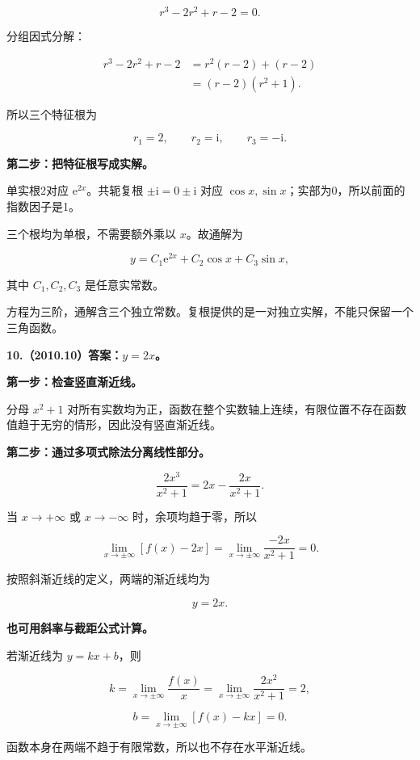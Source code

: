 \documentclass[UTF8,11pt,fontset=windows]{ctexart}
\begin{document}
$$
r^3-2r^2+r-2=0.
$$

分组因式分解：

$$
\begin{aligned}
r^3-2r^2+r-2
&=r^2(r-2)+(r-2)\\
&=(r-2)(r^2+1).
\end{aligned}
$$

所以三个特征根为

$$
r_1=2,\qquad r_2=\mathrm i,\qquad r_3=-\mathrm i.
$$

\textbf{第二步：把特征根写成实解。}

单实根2对应 $\mathrm e^{2x}$。共轭复根 $\pm\mathrm i=0\pm\mathrm i$ 对应 $\cos x,\sin x$；实部为0，所以前面的指数因子是1。

三个根均为单根，不需要额外乘以 $x$。故通解为

$$
\boxed{y=C_1\mathrm e^{2x}+C_2\cos x+C_3\sin x},
$$

其中 $C_1,C_2,C_3$ 是任意实常数。

方程为三阶，通解含三个独立常数。复根提供的是一对独立实解，不能只保留一个三角函数。

\clearpage

\textbf{10.（2010.10）答案：$y=2x$。}

\textbf{第一步：检查竖直渐近线。}

分母 $x^2+1$ 对所有实数均为正，函数在整个实数轴上连续，有限位置不存在函数值趋于无穷的情形，因此没有竖直渐近线。

\textbf{第二步：通过多项式除法分离线性部分。}

$$
\frac{2x^3}{x^2+1}
=2x-\frac{2x}{x^2+1}.
$$

当 $x\to+\infty$ 或 $x\to-\infty$ 时，余项均趋于零，所以

$$
\lim_{x\to\pm\infty}[f(x)-2x]
=\lim_{x\to\pm\infty}\frac{-2x}{x^2+1}=0.
$$

按照斜渐近线的定义，两端的渐近线均为

$$
\boxed{y=2x}.
$$

\textbf{也可用斜率与截距公式计算。}

若渐近线为 $y=kx+b$，则

$$
k=\lim_{x\to\pm\infty}\frac{f(x)}x
=\lim_{x\to\pm\infty}\frac{2x^2}{x^2+1}=2,
$$

$$
b=\lim_{x\to\pm\infty}[f(x)-kx]=0.
$$

函数本身在两端不趋于有限常数，所以也不存在水平渐近线。
\end{document}
